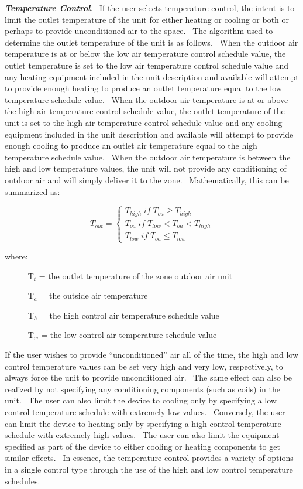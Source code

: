 \textbf{\emph{Temperature Control}}.~ If the user selects temperature control, the intent is to limit the outlet temperature of the unit for either heating or cooling or both or perhaps to provide unconditioned air to the space.~ The algorithm used to determine the outlet temperature of the unit is as follows.~ When the outdoor air temperature is at or below the low air temperature control schedule value, the outlet temperature is set to the low air temperature control schedule value and any heating equipment included in the unit description and available will attempt to provide enough heating to produce an outlet temperature equal to the low temperature schedule value.~ When the outdoor air temperature is at or above the high air temperature control schedule value, the outlet temperature of the unit is set to the high air temperature control schedule value and any cooling equipment included in the unit description and available will attempt to provide enough cooling to produce an outlet air temperature equal to the high temperature schedule value.~ When the outdoor air temperature is between the high and low temperature values, the unit will not provide any conditioning of outdoor air and will simply deliver it to the zone.~ Mathematically, this can be summarized as:

\begin{equation}
{T_{out}} = \left\{ {\begin{array}{*{20}{c}}{{T_{high}}\;if\;{T_{oa}} \ge {T_{high}}}\\ {{T_{oa}}\;if\;{T_{low}} < {T_{oa}} < {T_{high}}}\\ {{T_{low}}\;if\;{T_{oa}} \le {T_{low}}}\end{array}} \right.
\end{equation}

where:

~~~~~ T\(_{t}\) = the outlet temperature of the zone outdoor air unit

~~~~~ T\(_{a}\) = the outside air temperature

~~~~~ T\(_{h}\) = the high control air temperature schedule value

~~~~~ T\(_{w}\) = the low control air temperature schedule value

If the user wishes to provide ``unconditioned'' air all of the time, the high and low control temperature values can be set very high and very low, respectively, to always force the unit to provide unconditioned air.~ The same effect can also be realized by not specifying any conditioning components (such as coils) in the unit.~ The user can also limit the device to cooling only by specifying a low control temperature schedule with extremely low values.~ Conversely, the user can limit the device to heating only by specifying a high control temperature schedule with extremely high values.~ The user can also limit the equipment specified as part of the device to either cooling or heating components to get similar effects.~ In essence, the temperature control provides a variety of options in a single control type through the use of the high and low control temperature schedules.

